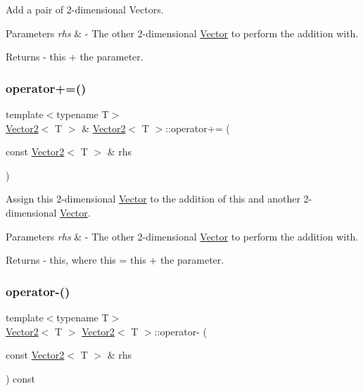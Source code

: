 Add a pair of 2-\/dimensional Vectors. 
\begin{DoxyParams}{Parameters}
{\em rhs} & -\/ The other 2-\/dimensional \mbox{\hyperlink{class_vector}{Vector}} to perform the addition with. \\
\hline
\end{DoxyParams}
\begin{DoxyReturn}{Returns}
-\/ this + the parameter. 
\end{DoxyReturn}
\mbox{\label{class_vector2_a198ab8bb7f0e0be8905869ccc5b2bf0e}} 
\subsubsection{\texorpdfstring{operator+=()}{operator+=()}}
{\footnotesize\ttfamily template$<$typename T$>$ \\
\mbox{\hyperlink{class_vector2}{Vector2}}$<$ T $>$ \& \mbox{\hyperlink{class_vector2}{Vector2}}$<$ T $>$\+::operator+= (\begin{DoxyParamCaption}\item[{const \mbox{\hyperlink{class_vector2}{Vector2}}$<$ T $>$ \&}]{rhs }\end{DoxyParamCaption})}

Assign this 2-\/dimensional \mbox{\hyperlink{class_vector}{Vector}} to the addition of this and another 2-\/dimensional \mbox{\hyperlink{class_vector}{Vector}}. 
\begin{DoxyParams}{Parameters}
{\em rhs} & -\/ The other 2-\/dimensional \mbox{\hyperlink{class_vector}{Vector}} to perform the addition with. \\
\hline
\end{DoxyParams}
\begin{DoxyReturn}{Returns}
-\/ this, where \textquotesingle{}this = this + the parameter\textquotesingle{}. 
\end{DoxyReturn}
\mbox{\label{class_vector2_ab79812a53ba6238fdcaef73cb22fcbb3}} 
\subsubsection{\texorpdfstring{operator-\/()}{operator-()}}
{\footnotesize\ttfamily template$<$typename T$>$ \\
\mbox{\hyperlink{class_vector2}{Vector2}}$<$ T $>$ \mbox{\hyperlink{class_vector2}{Vector2}}$<$ T $>$\+::operator-\/ (\begin{DoxyParamCaption}\item[{const \mbox{\hyperlink{class_vector2}{Vector2}}$<$ T $>$ \&}]{rhs }\end{DoxyParamCaption}) const}

